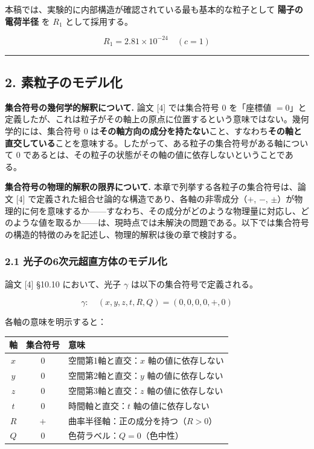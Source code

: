 \documentclass[
  a4paper,11pt]{ltjsarticle}
\newcounter{none}
\theoremstyle{definition}
\theoremstyle{remark}
\begin{document}
本稿では、実験的に内部構造が確認されている最も基本的な粒子として
\textbf{陽子の電荷半径} を \(R_1\) として採用する。

\[R_1 = 2.81 \times 10^{-24} \quad (c = 1)\]

\begin{center}\rule{0.5\linewidth}{0.5pt}\end{center}

\subsection{2.
素粒子のモデル化}\label{ux7d20ux7c92ux5b50ux306eux30e2ux30c7ux30ebux5316}

\textbf{集合符号の幾何学的解釈について.} 論文 {[}4{]} では集合符号 \(0\)
を「座標値
\(= 0\)」と定義したが、これは粒子がその軸上の原点に位置するという意味ではない。幾何学的には、集合符号
\(0\)
は\textbf{その軸方向の成分を持たない}こと、すなわち\textbf{その軸と直交している}ことを意味する。したがって、ある粒子の集合符号がある軸について
\(0\)
であるとは、その粒子の状態がその軸の値に依存しないということである。

\textbf{集合符号の物理的解釈の限界について.}
本章で列挙する各粒子の集合符号は、論文 {[}4{]}
で定義された組合せ論的な構造であり、各軸の非零成分（\(+\), \(-\),
\(\pm\)）が物理的に何を意味するか------すなわち、その成分がどのような物理量に対応し、どのような値を取るか------は、現時点では未解決の問題である。以下では集合符号の構造的特徴のみを記述し、物理的解釈は後の章で検討する。

\subsubsection{2.1
光子の6次元超直方体のモデル化}\label{ux5149ux5b50ux306e6ux6b21ux5143ux8d85ux76f4ux65b9ux4f53ux306eux30e2ux30c7ux30ebux5316}

論文 {[}4{]} §10.10 において、光子 \(\gamma\)
は以下の集合符号で定義される。

\[\gamma: \quad (x, y, z, t, R, Q) = (0, 0, 0, 0, +, 0)\]

各軸の意味を明示すると：

{\def\LTcaptype{none} %
\begin{longtable}[]{@{}ccl@{}}
\toprule\noalign{}
軸 & 集合符号 & 意味 \\
\midrule\noalign{}
\endhead
\bottomrule\noalign{}
\endlastfoot
\(x\) & \(0\) & 空間第1軸と直交：\(x\) 軸の値に依存しない \\
\(y\) & \(0\) & 空間第2軸と直交：\(y\) 軸の値に依存しない \\
\(z\) & \(0\) & 空間第3軸と直交：\(z\) 軸の値に依存しない \\
\(t\) & \(0\) & 時間軸と直交：\(t\) 軸の値に依存しない \\
\(R\) & \(+\) & 曲率半径軸：正の成分を持つ（\(R > 0\)） \\
\(Q\) & \(0\) & 色荷ラベル：\(Q = 0\)（色中性） \\
\end{longtable}
}
\end{document}
